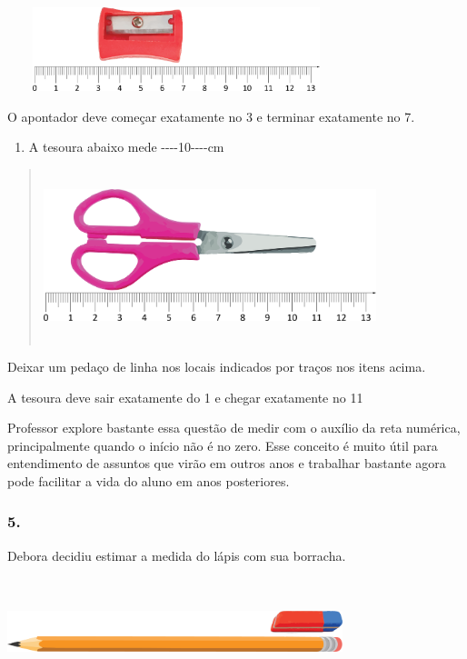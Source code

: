 \includegraphics[width=3.87534in,height=0.95842in]{media/image44.png}

O apontador deve começar exatamente no 3 e terminar exatamente no 7.

\begin{enumerate}
\def\labelenumi{\alph{enumi})}
\item
  A tesoura abaixo mede -\/-\/-\/-10-\/-\/-\/-cm
\end{enumerate}

\begin{quote}
\includegraphics[width=3.81700in,height=1.97517in]{media/image45.png}
\end{quote}

Deixar um pedaço de linha nos locais indicados por traços nos itens
acima.

A tesoura deve sair exatamente do 1 e chegar exatamente no 11

Professor explore bastante essa questão de medir com o auxílio da reta
numérica, principalmente quando o início não é no zero. Esse conceito é
muito útil para entendimento de assuntos que virão em outros anos e
trabalhar bastante agora pode facilitar a vida do aluno em anos
posteriores.

\subsubsection{5. }\label{section-55}

Debora decidiu estimar a medida do lápis com sua borracha.

\includegraphics[width=3.84200in,height=1.23344in]{media/image46.png}

